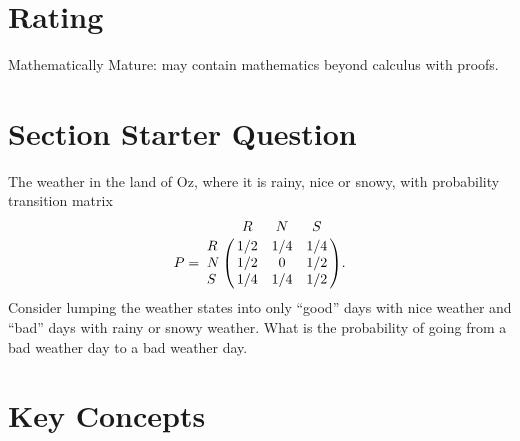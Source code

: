 \documentclass[12pt]{article}
\begin{document}
\myheader \mytitle

\hr


\hr

\usefirefox

\hr



\section*{Rating} %
Mathematically Mature:  may contain mathematics beyond calculus with
proofs. %

\hr

\section*{Section Starter Question}

The weather in the land of Oz, where it is
    rainy, nice or snowy, with probability transition matrix
    \[
        P = \bordermatrix{ & R & N & S \cr
        R & 1/2 & 1/4 & 1/4 \cr
        N & 1/2 & 0 & 1/2 \cr
        S & 1/4 & 1/4 & 1/2 }.
    \]  Consider lumping the weather states into only ``good'' days
    with nice weather and ``bad'' days with rainy or snowy weather.
    What is the probability of going from a bad weather day to a bad
    weather day.
    \hr

\section*{Key Concepts}
\end{document}
